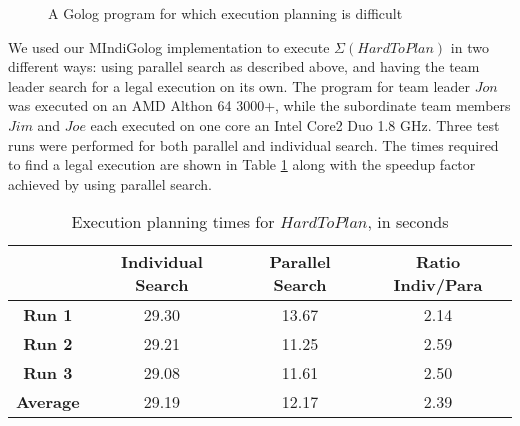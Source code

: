 %
\begin{figure}[!t]
 

\begin{centering}
\framebox{%
\parbox[t][1\totalheight]{0.85\columnwidth}{%
\begin{gather*}
\mathbf{proc}\, HardToPlan()\\
\left[AcquireType(Joe,Carrot)\,;\right.\\
AcquireType(Jon,Sugar)\,;\\
AcquireType(Jim,Lettuce)\,;\\
AcquireType(Joe,Flour)\,;\\
AcquireType(Jon,Flour)\,;\\
HasObject(Jon,Carrot3)?\,;\\
HasObject(Joe,Flour5)?\,;\\
\left.\, HasObject(Jon,Sugar4)?\right]\,\,\mathbf{end}\\
\\\mathbf{proc}\, AcquireType(Agt,Type)\\
\pi(obj,\, IsType(obj,Type)?\,;\\
\left.\, acquire(Agt,obj)))\right]\,\,\mathbf{end}\end{gather*}
}} 
\par\end{centering}

\caption{A Golog program for which execution planning is difficult\label{fig:MIndiGolog:HardToPlan}}

\end{figure}


We used our MIndiGolog implementation to execute $\Sigma(HardToPlan)$
in two different ways: using parallel search as described above, and
having the team leader search for a legal execution on its own. The
program for team leader $Jon$ was executed on an AMD Althon 64 3000+,
while the subordinate team members $Jim$ and $Joe$ each executed
on one core an Intel Core2 Duo 1.8 GHz. Three test runs were performed
for both parallel and individual search. The times required to find
a legal execution are shown in Table \ref{tab:MIndiGolog:Execution-planning-times}
along with the speedup factor achieved by using parallel search.

%
\begin{table}[!t]
 

\begin{centering}
\begin{tabular}{|c|c|c|c|}
\hline 
 & \textbf{Individual Search}  & \textbf{Parallel Search}  & \textbf{Ratio Indiv/Para}\tabularnewline
\hline
\hline 
\textbf{Run 1}  & 29.30  & 13.67  & 2.14\tabularnewline
\hline 
\textbf{Run 2}  & 29.21  & 11.25  & 2.59\tabularnewline
\hline 
\textbf{Run 3}  & 29.08  & 11.61  & 2.50\tabularnewline
\hline
\hline 
\textbf{Average}  & 29.19  & 12.17  & 2.39\tabularnewline
\hline
\end{tabular}
\par\end{centering}

\caption{Execution planning times for $HardToPlan$, in seconds\label{tab:MIndiGolog:Execution-planning-times}}

\end{table}


